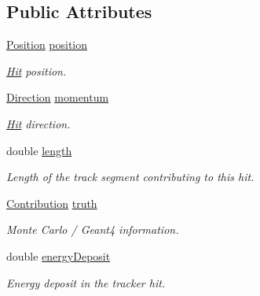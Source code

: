 \subsection*{Public Attributes}
\begin{DoxyCompactItemize}
\item 
\hyperlink{namespace_d_d4hep_1_1_simulation_ad6fd94b3439e31d1ba4b2e640d578558}{Position} \hyperlink{class_d_d4hep_1_1_simulation_1_1_geant4_tracker_1_1_hit_a7f992369c5178cac0cc00ffc8a9c36a0}{position}
\begin{DoxyCompactList}\small\item\em \hyperlink{class_d_d4hep_1_1_simulation_1_1_geant4_tracker_1_1_hit}{Hit} position. \item\end{DoxyCompactList}\item 
\hyperlink{namespace_d_d4hep_1_1_simulation_a4b5bfd838293f3222b9d004c7dd1d6b3}{Direction} \hyperlink{class_d_d4hep_1_1_simulation_1_1_geant4_tracker_1_1_hit_abdd1f621f202ef83c2078a52cbb242b3}{momentum}
\begin{DoxyCompactList}\small\item\em \hyperlink{class_d_d4hep_1_1_simulation_1_1_geant4_tracker_1_1_hit}{Hit} direction. \item\end{DoxyCompactList}\item 
double \hyperlink{class_d_d4hep_1_1_simulation_1_1_geant4_tracker_1_1_hit_a39d50debf1a95beaad59be2477877327}{length}
\begin{DoxyCompactList}\small\item\em Length of the track segment contributing to this hit. \item\end{DoxyCompactList}\item 
\hyperlink{class_d_d4hep_1_1_simulation_1_1_geant4_hit_data_1_1_monte_carlo_contrib}{Contribution} \hyperlink{class_d_d4hep_1_1_simulation_1_1_geant4_tracker_1_1_hit_ab786ed42d3c88d911b662e8a083bc54e}{truth}
\begin{DoxyCompactList}\small\item\em Monte Carlo / Geant4 information. \item\end{DoxyCompactList}\item 
double \hyperlink{class_d_d4hep_1_1_simulation_1_1_geant4_tracker_1_1_hit_a6dddc87da956928e52374040b025f7e4}{energyDeposit}
\begin{DoxyCompactList}\small\item\em Energy deposit in the tracker hit. \item\end{DoxyCompactList}\end{DoxyCompactItemize}


